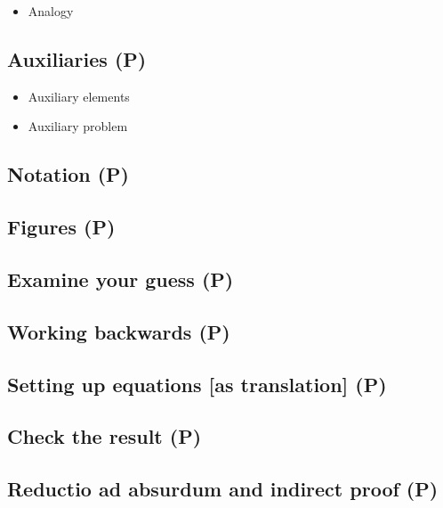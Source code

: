 \documentclass[
  a4paper,
  DIV=11,
  numbers=noendperiod,
  oneside]{scrreprt}
\providecommand{\tightlist}{%
  \setlength{\itemsep}{0pt}\setlength{\parskip}{0pt}}
\begin{document}
\begin{itemize}
\tightlist
\item
  Analogy
\end{itemize}

\subsection{Auxiliaries (P)}\label{auxiliaries-p}

\begin{itemize}
\tightlist
\item
  Auxiliary elements
\item
  Auxiliary problem
\end{itemize}

\subsection{Notation (P)}\label{notation-p}

\subsection{Figures (P)}\label{figures-p}

\subsection{Examine your guess (P)}\label{examine-your-guess-p}

\subsection{Working backwards (P)}\label{working-backwards-p}

\subsection{Setting up equations {[}as translation{]}
(P)}\label{setting-up-equations-as-translation-p}

\subsection{Check the result (P)}\label{check-the-result-p}

\subsection{Reductio ad absurdum and indirect proof
(P)}\label{reductio-ad-absurdum-and-indirect-proof-p}
\end{document}
